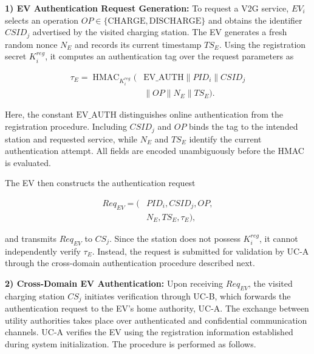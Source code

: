 \documentclass[twocolumn,10pt,journal]{IEEEtran}
\begin{document}
\noindent\textbf{1) EV Authentication Request Generation:}
To request a V2G service, $EV_i$ selects an operation
$OP\in\{\mathrm{CHARGE},\mathrm{DISCHARGE}\}$ and obtains
the identifier $CSID_j$ advertised by the visited charging
station. The EV generates a fresh random nonce $N_E$
and records its current timestamp $TS_E$. Using the
registration secret $K_i^{reg}$, it computes an
authentication tag over the request parameters as

\begin{equation}
\begin{aligned}
\tau_E = \operatorname{HMAC}_{K_i^{reg}}\big(
&\mathrm{EV\_AUTH}\parallel PID_i
\parallel CSID_j\\
&\parallel OP\parallel N_E
\parallel TS_E\big).
\end{aligned}
\label{eq:ev_auth_proof}
\end{equation}

Here, the constant $\mathrm{EV\_AUTH}$ distinguishes
online authentication from the registration procedure.
Including $CSID_j$ and $OP$ binds the tag to the intended
station and requested service, while $N_E$ and $TS_E$
identify the current authentication attempt. All fields
are encoded unambiguously before the HMAC is evaluated.

The EV then constructs the authentication request

\begin{equation}
\begin{aligned}
Req_{EV} = (&PID_i, CSID_j, OP,\\
            &N_E, TS_E, \tau_E),
\end{aligned}
\label{eq:ev_auth_request}
\end{equation}

and transmits $Req_{EV}$ to $CS_j$. Since the station
does not possess $K_i^{reg}$, it cannot independently
verify $\tau_E$. Instead, the request is submitted
for validation by UC-A through the cross-domain
authentication procedure described next.

\noindent\textbf{2) Cross-Domain EV Authentication:}
Upon receiving $Req_{EV}$, the visited charging station
$CS_j$ initiates verification through UC-B, which forwards
the authentication request to the EV's home authority,
UC-A. The exchange between utility authorities takes
place over authenticated and confidential communication
channels. UC-A verifies the EV using the registration
information established during system initialization.
The procedure is performed as follows.
\end{document}
